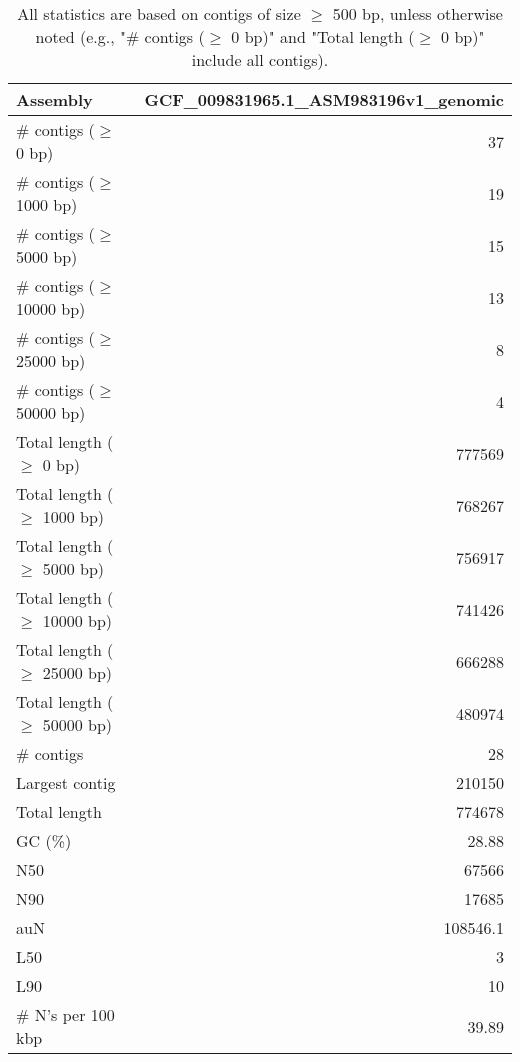 \documentclass[12pt,a4paper]{article}
\begin{document}
\begin{table}[ht]
\begin{center}
\caption{All statistics are based on contigs of size $\geq$ 500 bp, unless otherwise noted (e.g., "\# contigs ($\geq$ 0 bp)" and "Total length ($\geq$ 0 bp)" include all contigs).}
\begin{tabular}{|l*{1}{|r}|}
\hline
Assembly & GCF\_009831965.1\_ASM983196v1\_genomic \\ \hline
\# contigs ($\geq$ 0 bp) & 37 \\ \hline
\# contigs ($\geq$ 1000 bp) & 19 \\ \hline
\# contigs ($\geq$ 5000 bp) & 15 \\ \hline
\# contigs ($\geq$ 10000 bp) & 13 \\ \hline
\# contigs ($\geq$ 25000 bp) & 8 \\ \hline
\# contigs ($\geq$ 50000 bp) & 4 \\ \hline
Total length ($\geq$ 0 bp) & 777569 \\ \hline
Total length ($\geq$ 1000 bp) & 768267 \\ \hline
Total length ($\geq$ 5000 bp) & 756917 \\ \hline
Total length ($\geq$ 10000 bp) & 741426 \\ \hline
Total length ($\geq$ 25000 bp) & 666288 \\ \hline
Total length ($\geq$ 50000 bp) & 480974 \\ \hline
\# contigs & 28 \\ \hline
Largest contig & 210150 \\ \hline
Total length & 774678 \\ \hline
GC (\%) & 28.88 \\ \hline
N50 & 67566 \\ \hline
N90 & 17685 \\ \hline
auN & 108546.1 \\ \hline
L50 & 3 \\ \hline
L90 & 10 \\ \hline
\# N's per 100 kbp & 39.89 \\ \hline
\end{tabular}
\end{center}
\end{table}
\end{document}
